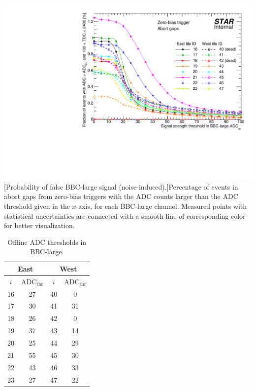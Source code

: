 \begin{table}[h]
	\begin{minipage}{0.65\linewidth}
		\centering
		\includegraphics[width=\linewidth]{graphics/eventSelection/bbc/BbbLargeThreshold.pdf}
		[Probability of false BBC-large signal (noise-induced).]{Percentage of events in abort gaps from zero-bias triggers with the ADC counts larger than the ADC threshold given in the $x$-axis, for each BBC-large channel. Measured points with statistical uncertainties are connected with a smooth line of corresponding color for better visualization.}
		\label{fig:bbcLargeThresholds}
	\end{minipage}\hfill
	\begin{minipage}{0.3\linewidth}
		\centering
		\begin{tabular}{c|c||c|c}
			\multicolumn{2}{c||}{East} & \multicolumn{2}{c}{West} \\ \hline
			$i$  & $\text{ADC}_{\text{thr}}$ & $i$  & $\text{ADC}_{\text{thr}}$ \\ \hline
			16 & 27 & 40 & 0 \\
			17 & 30 & 41 & 31 \\
			18 & 26 & 42 & 0 \\
			19 & 37 & 43 & 14 \\
			20 & 25 & 44 & 29 \\
			21 & 55 & 45 & 30 \\
			22 & 43 & 46 & 33 \\
			23 & 27 & 47 & 22 \\
		\end{tabular}
		\caption[Offline ADC thresholds in BBC-large.]{Offline ADC thresholds in BBC-large.\newline\newline\newline\newline\newline\newline\newline\newline}
		\label{tab:bbcLargeThresholds}
	\end{minipage}

\end{table}


